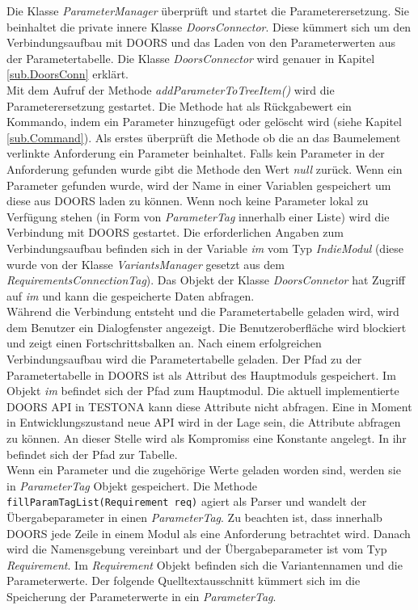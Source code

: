 Die Klasse \textit{ParameterManager} überprüft und startet die Parameterersetzung. Sie beinhaltet die private innere Klasse \textit{DoorsConnector}. Diese kümmert sich um den Verbindungsaufbau mit DOORS und das Laden von den Parameterwerten aus der Parametertabelle. Die Klasse \textit{DoorsConnector} wird genauer in Kapitel \ref{sub.DoorsConn} erklärt.\\


Mit dem Aufruf der Methode \textit{addParameterToTreeItem()} wird die Parameterersetzung gestartet. Die Methode hat als Rückgabewert ein Kommando, indem ein Parameter hinzugefügt oder gelöscht wird (siehe Kapitel \ref{sub.Command}). Als erstes überprüft die Methode ob die an das Baumelement verlinkte Anforderung ein Parameter beinhaltet. Falls kein Parameter in der Anforderung gefunden wurde gibt die Methode den Wert \textit{null} zurück. Wenn ein Parameter gefunden wurde, wird der Name in einer Variablen gespeichert um diese aus DOORS laden zu können. Wenn noch keine Parameter lokal zu Verfügung stehen (in Form von \textit{ParameterTag} innerhalb einer Liste) wird die Verbindung mit DOORS gestartet. Die erforderlichen Angaben zum Verbindungsaufbau befinden sich in der Variable \textit{im} vom Typ \textit{IndieModul} (diese wurde von der Klasse \textit{VariantsManager} gesetzt aus dem \textit{RequirementsConnectionTag}). Das Objekt der Klasse \textit{DoorsConnetor} hat Zugriff auf \textit{im} und kann die gespeicherte Daten abfragen.\\


Während die Verbindung entsteht und die Parametertabelle geladen wird, wird dem Benutzer ein Dialogfenster angezeigt. Die Benutzeroberfläche wird blockiert und zeigt einen Fortschrittsbalken an. Nach einem erfolgreichen Verbindungsaufbau wird die Parametertabelle geladen. Der Pfad zu der Parametertabelle in DOORS ist als Attribut des Hauptmoduls gespeichert. Im Objekt \textit{im} befindet sich der Pfad zum Hauptmodul. Die aktuell implementierte DOORS API in TESTONA kann diese Attribute nicht abfragen. Eine in Moment in Entwicklungszustand neue API wird in der Lage sein, die Attribute abfragen zu können. An dieser Stelle wird als Kompromiss eine Konstante angelegt. In ihr befindet sich der Pfad zur Tabelle.\\

 
Wenn ein Parameter und die zugehörige Werte geladen worden sind, werden sie in \textit{ParameterTag} Objekt gespeichert. Die Methode \texttt{fillParamTagList(Requirement req)} agiert als Parser und wandelt der Übergabeparameter in einen \textit{ParameterTag}. Zu beachten ist, dass innerhalb DOORS jede Zeile in einem Modul als eine Anforderung betrachtet wird. Danach wird die Namensgebung vereinbart und der Übergabeparameter ist vom Typ \textit{Requirement}. Im \textit{Requirement} Objekt befinden sich die Variantennamen und die Parameterwerte. Der folgende Quelltextausschnitt kümmert sich im die Speicherung der Parameterwerte in ein \textit{ParameterTag}.\\


